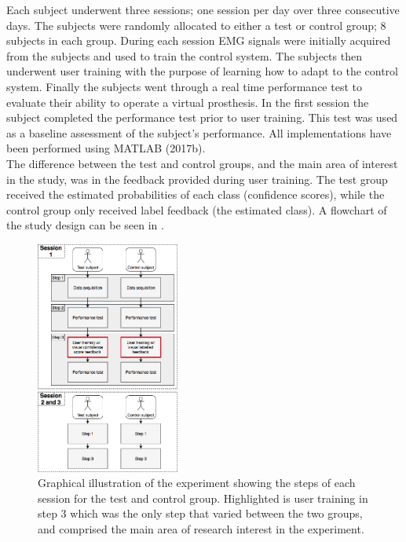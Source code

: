 Each subject underwent three sessions; one session per day over three consecutive days. The subjects were randomly allocated to either a test or control group; 8 subjects in each group. During each session EMG signals were initially acquired from the subjects and used to train the control system. The subjects then underwent user training with the purpose of learning how to adapt to the control system. Finally the subjects went through a real time performance test to evaluate their ability to operate a virtual prosthesis. In the first session the subject completed the performance test prior to user training. This test was used as a baseline assessment of the subject's performance. All implementations have been performed using MATLAB (2017b). \\
The difference between the test and control groups, and the main area of interest in the study, was in the feedback provided during user training. The test group received the estimated probabilities of each class (confidence scores), while the control group only received label feedback (the estimated class). A flowchart of the study design can be seen in .


\begin{figure}[H]                                         
	\includegraphics[width=0.42\textwidth]{figures/Paper/Study_design}  
	\caption{Graphical illustration of the experiment showing the steps of each session for the test and control group. Highlighted is user training in step 3 which was the only step that varied between the two groups, and comprised the main area of research interest in the experiment.}
	\label{fig:P:std} 
\end{figure}